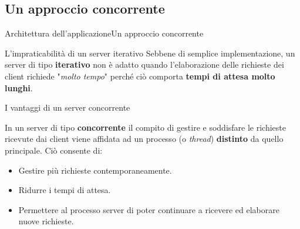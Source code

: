 \documentclass[10pt]{beamer}
\begin{document}
\subsection{Un approccio concorrente}
\begin{frame}{Architettura dell'applicazione}{Un approccio concorrente}

\begin{block}{L'impraticabilità di un server iterativo}
Sebbene di semplice implementazione, un server di tipo \textbf{iterativo} non è adatto quando l'elaborazione delle richieste dei client richiede "\textit{molto tempo}" perché ciò comporta \textbf{tempi di attesa molto lunghi}.
\end{block}

\begin{block}{I vantaggi di un server concorrente}

In un server di tipo \textbf{concorrente} il compito di gestire e soddisfare le richieste ricevute dai client viene affidata ad un processo (o \textit{thread}) \textbf{distinto} da quello principale. Ciò consente di: 
\begin{itemize}
\item Gestire più richieste contemporaneamente.
\item Ridurre i tempi di attesa.
\item Permettere al processo server di poter continuare a ricevere ed elaborare nuove richieste.
\end{itemize}

\end{block}

\end{frame}

\end{document}
